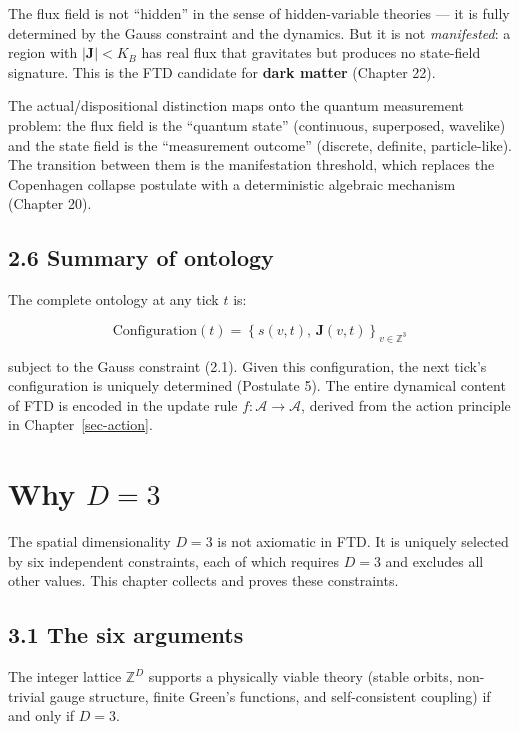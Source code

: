 \documentclass[
  11pt,
  letterpaper,
  twoside,
  openright]{book}
\begin{document}
The flux field is not ``hidden'' in the sense of hidden-variable
theories --- it is fully determined by the Gauss constraint and the
dynamics. But it is not \emph{manifested}: a region with
\(|\mathbf{J}| < K_B\) has real flux that gravitates but produces no
state-field signature. This is the FTD candidate for \textbf{dark
matter} (Chapter 22).

The actual/dispositional distinction maps onto the quantum measurement
problem: the flux field is the ``quantum state'' (continuous,
superposed, wavelike) and the state field is the ``measurement outcome''
(discrete, definite, particle-like). The transition between them is the
manifestation threshold, which replaces the Copenhagen collapse
postulate with a deterministic algebraic mechanism (Chapter 20).

\section{2.6 Summary of ontology}\label{summary-of-ontology}

The complete ontology at any tick \(t\) is:

\[
\text{Configuration}(t) = \left\{ s(v,t), \, \mathbf{J}(v,t) \right\}_{v \in \mathbb{Z}^3}
\]

subject to the Gauss constraint (2.1). Given this configuration, the
next tick's configuration is uniquely determined (Postulate 5). The
entire dynamical content of FTD is encoded in the update rule
\(f : \mathcal{A} \to \mathcal{A}\), derived from the action principle
in Chapter~\ref{sec-action}.

\chapter{\texorpdfstring{Why \(D = 3\)}{Why D = 3}}\label{sec-d3}

The spatial dimensionality \(D = 3\) is not axiomatic in FTD. It is
uniquely selected by six independent constraints, each of which requires
\(D = 3\) and excludes all other values. This chapter collects and
proves these constraints.

\section{3.1 The six arguments}\label{the-six-arguments}

\begin{ftdtheorem}

The integer lattice \(\mathbb{Z}^D\) supports a physically viable theory
(stable orbits, non-trivial gauge structure, finite Green's functions,
and self-consistent coupling) if and only if \(D = 3\).

\end{ftdtheorem}
\end{document}
